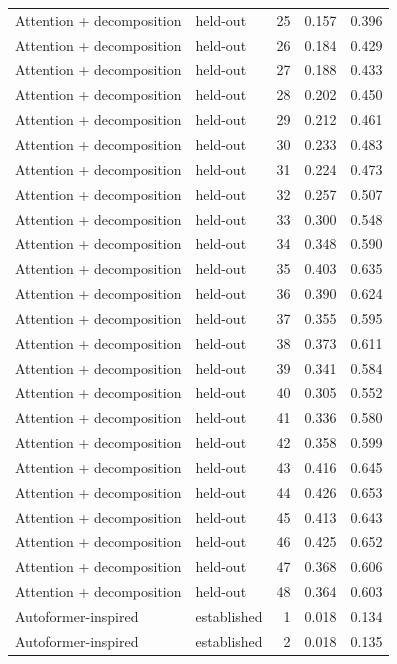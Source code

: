 \begin{tabular}{llrrr}
Attention + decomposition & held-out & 25 & 0.157 & 0.396 \\
Attention + decomposition & held-out & 26 & 0.184 & 0.429 \\
Attention + decomposition & held-out & 27 & 0.188 & 0.433 \\
Attention + decomposition & held-out & 28 & 0.202 & 0.450 \\
Attention + decomposition & held-out & 29 & 0.212 & 0.461 \\
Attention + decomposition & held-out & 30 & 0.233 & 0.483 \\
Attention + decomposition & held-out & 31 & 0.224 & 0.473 \\
Attention + decomposition & held-out & 32 & 0.257 & 0.507 \\
Attention + decomposition & held-out & 33 & 0.300 & 0.548 \\
Attention + decomposition & held-out & 34 & 0.348 & 0.590 \\
Attention + decomposition & held-out & 35 & 0.403 & 0.635 \\
Attention + decomposition & held-out & 36 & 0.390 & 0.624 \\
Attention + decomposition & held-out & 37 & 0.355 & 0.595 \\
Attention + decomposition & held-out & 38 & 0.373 & 0.611 \\
Attention + decomposition & held-out & 39 & 0.341 & 0.584 \\
Attention + decomposition & held-out & 40 & 0.305 & 0.552 \\
Attention + decomposition & held-out & 41 & 0.336 & 0.580 \\
Attention + decomposition & held-out & 42 & 0.358 & 0.599 \\
Attention + decomposition & held-out & 43 & 0.416 & 0.645 \\
Attention + decomposition & held-out & 44 & 0.426 & 0.653 \\
Attention + decomposition & held-out & 45 & 0.413 & 0.643 \\
Attention + decomposition & held-out & 46 & 0.425 & 0.652 \\
Attention + decomposition & held-out & 47 & 0.368 & 0.606 \\
Attention + decomposition & held-out & 48 & 0.364 & 0.603 \\
Autoformer-inspired & established & 1 & 0.018 & 0.134 \\
Autoformer-inspired & established & 2 & 0.018 & 0.135 \\

\end{tabular}
